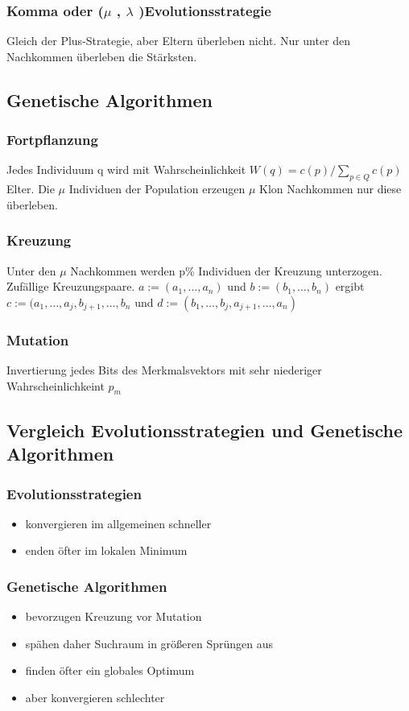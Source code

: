 \subsubsection{Komma oder 
($\mu$ , $\lambda$ 
)Evolutionsstrategie}
Gleich der Plus-Strategie, aber 
Eltern überleben nicht. Nur unter den 
Nachkommen überleben die Stärksten.

\subsection{Genetische Algorithmen}
\subsubsection{Fortpflanzung}
	Jedes Individuum q wird mit Wahrscheinlichkeit $W(q)=c(p)/ \sum_{p \in Q}c(p)$ Elter. Die $\mu$ Individuen der Population erzeugen $\mu$ Klon Nachkommen nur diese überleben.
\subsubsection{Kreuzung}
Unter den $\mu$ Nachkommen werden p\% Individuen der Kreuzung unterzogen. Zufällige Kreuzungspaare. 
$a:= (a_1, \dots , a_n)$ und $ b:=(b_1, \dots , b_n)$ ergibt $c:= (a_1 , \dots , a_j , b_{j+1} , \dots , b_n$ und $d:= ( b_1 , \dots , b_j , a_{j+1} , \dots , a_n)$
\subsubsection{Mutation}
Invertierung jedes Bits des Merkmalsvektors mit sehr niederiger Wahrscheinlichkeint $p_m$

\subsection{Vergleich Evolutionsstrategien und Genetische Algorithmen}
\subsubsection{Evolutionsstrategien}
	\begin{itemize}
		\item konvergieren im allgemeinen schneller
		\item enden öfter im lokalen Minimum
	\end{itemize}
\subsubsection{Genetische Algorithmen}
	\begin{itemize}
		\item bevorzugen Kreuzung vor Mutation
		\item spähen daher Suchraum in größeren Sprüngen aus
		\item finden öfter ein globales Optimum
		\item aber konvergieren schlechter
	\end{itemize}
	
